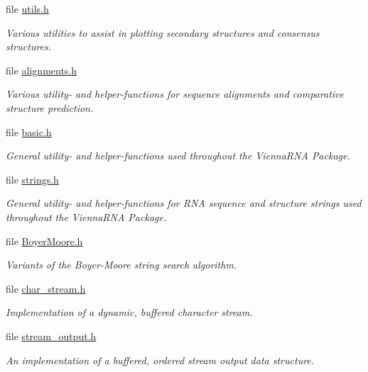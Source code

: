 \begin{DoxyCompactItemize}
file \mbox{\hyperlink{plotting_2utils_8h}{utils.\+h}}
\begin{DoxyCompactList}\small\item\em Various utilities to assist in plotting secondary structures and consensus structures. \end{DoxyCompactList}\item 
file \mbox{\hyperlink{utils_2alignments_8h}{alignments.\+h}}
\begin{DoxyCompactList}\small\item\em Various utility-\/ and helper-\/functions for sequence alignments and comparative structure prediction. \end{DoxyCompactList}\item 
file \mbox{\hyperlink{utils_2basic_8h}{basic.\+h}}
\begin{DoxyCompactList}\small\item\em General utility-\/ and helper-\/functions used throughout the {\itshape Vienna\+R\+NA} {\itshape Package}. \end{DoxyCompactList}\item 
file \mbox{\hyperlink{strings_8h}{strings.\+h}}
\begin{DoxyCompactList}\small\item\em General utility-\/ and helper-\/functions for R\+NA sequence and structure strings used throughout the Vienna\+R\+NA Package. \end{DoxyCompactList}\item 
file \mbox{\hyperlink{BoyerMoore_8h}{Boyer\+Moore.\+h}}
\begin{DoxyCompactList}\small\item\em Variants of the Boyer-\/\+Moore string search algorithm. \end{DoxyCompactList}\item 
file \mbox{\hyperlink{datastructures_2char__stream_8h}{char\+\_\+stream.\+h}}
\begin{DoxyCompactList}\small\item\em Implementation of a dynamic, buffered character stream. \end{DoxyCompactList}\item 
file \mbox{\hyperlink{datastructures_2stream__output_8h}{stream\+\_\+output.\+h}}
\begin{DoxyCompactList}\small\item\em An implementation of a buffered, ordered stream output data structure. \end{DoxyCompactList}\end{DoxyCompactItemize}

